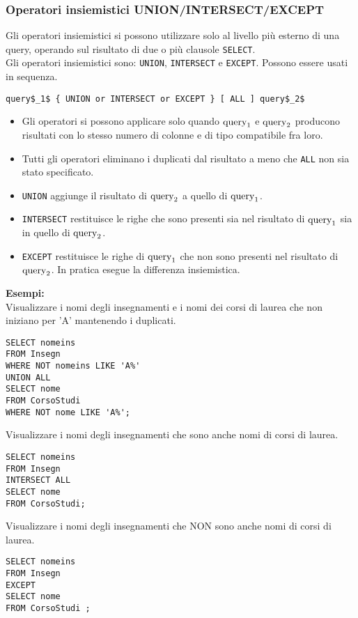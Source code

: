 \documentclass[a4paper, 10pt, titlepage]{article}
\begin{document}
	\subsubsection*{Operatori insiemistici UNION/INTERSECT/EXCEPT}
		Gli operatori insiemistici si possono utilizzare solo al livello più esterno
		di una query, operando sul risultato di due o più clausole \lstinline|SELECT|.\\
		Gli operatori insiemistici sono: \lstinline|UNION|, \lstinline|INTERSECT| e \lstinline|EXCEPT|. Possono essere usati in sequenza.
		\begin{lstlisting}[mathescape]
query$_1$ { UNION or INTERSECT or EXCEPT } [ ALL ] query$_2$
		\end{lstlisting}
		\begin{itemize}
				\item Gli operatori si possono applicare solo quando $ \textup{query}_1 $ e 
				$ \textup{query}_2 $ producono risultati con lo stesso numero di colonne e di tipo compatibile
				fra loro.
				\item Tutti gli operatori eliminano i duplicati dal risultato a meno che \lstinline|ALL| non
				sia stato specificato.
				\item \lstinline|UNION| aggiunge il risultato di $ \textup{query}_2 $ a quello di 
				$ \textup{query}_1 $.
				\item \lstinline|INTERSECT| restituisce le righe che sono presenti sia nel risultato di
				$ \textup{query}_1 $ sia in quello di $ \textup{query}_2 $.
				\item \lstinline|EXCEPT| restituisce le righe di $ \textup{query}_1 $ che non sono presenti nel risultato
				di $ \textup{query}_2 $. In pratica esegue la differenza insiemistica.
			\end{itemize}
		\textbf{Esempi: }\\
		Visualizzare i nomi degli insegnamenti e i nomi dei corsi di laurea che non
		iniziano per ’A’ mantenendo i duplicati.
		\begin{lstlisting}
SELECT nomeins
FROM Insegn
WHERE NOT nomeins LIKE 'A%'
UNION ALL
SELECT nome
FROM CorsoStudi
WHERE NOT nome LIKE 'A%';
		\end{lstlisting} \medskip
		Visualizzare i nomi degli insegnamenti che sono anche nomi di corsi di
		laurea.
		\begin{lstlisting}
SELECT nomeins
FROM Insegn
INTERSECT ALL
SELECT nome
FROM CorsoStudi;
		\end{lstlisting} \medskip
		Visualizzare i nomi degli insegnamenti che NON sono anche nomi di corsi di
		laurea.
		\begin{lstlisting}
SELECT nomeins
FROM Insegn
EXCEPT
SELECT nome
FROM CorsoStudi ;
		\end{lstlisting}
	\newpage
\end{document}
